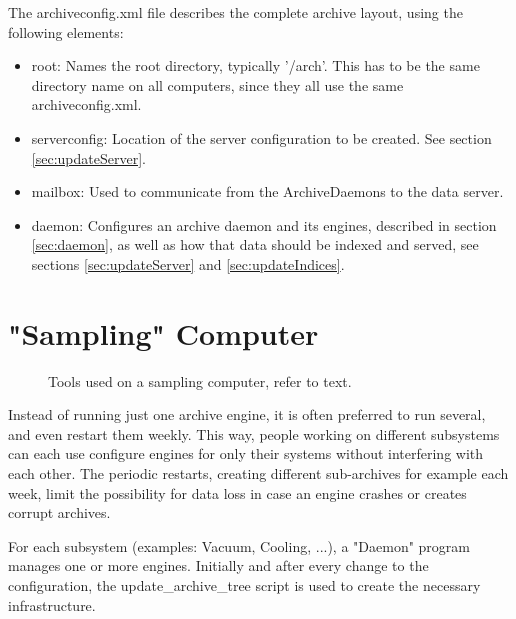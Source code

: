 

\noindent The archiveconfig.xml file describes the complete archive layout,
using the following elements:
\begin{itemize}
\item root: Names the root directory, typically '/arch'.
      This has to be the same directory name on all computers,
      since they all use the same archiveconfig.xml.
\item serverconfig: Location of the server configuration to be
      created. See section \ref{sec:updateServer}.
\item mailbox: Used to communicate from the ArchiveDaemons to
      the data server.
\item daemon: Configures an archive daemon and its engines,
      described in section \ref{sec:daemon},
      as well as how that data should be indexed and served,
      see sections \ref{sec:updateServer} and \ref{sec:updateIndices}.
\end{itemize}

\section{"Sampling" Computer}
\begin{figure}[htb]
\begin{center}
\end{center}
\caption{\label{fig:acSample}Tools used on a sampling computer, refer to text.}
\end{figure}

\noindent Instead of running just one archive engine, it is often preferred to
run several, and even restart them weekly. This way, people working on different
subsystems can each use configure engines for only their systems without interfering
with each other.
The periodic restarts, creating different sub-archives for example each week,
limit the possibility for data loss in case an engine crashes or creates
corrupt archives.

For each subsystem (examples: Vacuum, Cooling, ...), a "Daemon" program
manages one or more engines.
Initially and after every change to the configuration,
the update\_archive\_tree script is used to create the necessary infrastructure.

